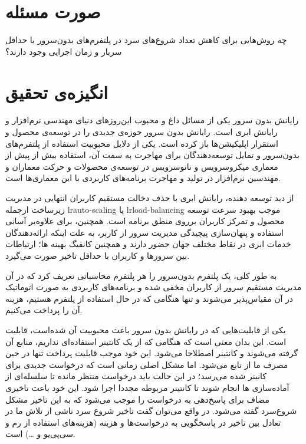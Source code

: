\label{intro}

\section{صورت مسئله}
\par 
چه روش‌هایی برای کاهش تعداد شروع‌های سرد در پلتفرم‌های بدون‌سرور  با حداقل سربار  و زمان اجرایی وجود دارند؟ 

\section{انگیزه‌ی تحقیق}
\par
رایانش بدون سرور یکی از مسائل داغ و محبوب این‌روز‌های دنیای مهندسی نرم‌افزار و رایانش ابری است. رایانش بدون سرور حوزه‌ی جدیدی را در توسعه‌ی محصول و استقرار اپلیکیشن‌ها باز کرده است. یکی از دلایل محبوبیت استفاده از پلتفرم‌های بدون‌سرور و تمایل توسعه‌دهندگان برای مهاجرت به سمت آن، استفاده بیش از پیش از معماری میکروسرویس و نانوسرویس در توسعه‌ی محصولات و حرکت معماران و مهندسین نرم‌افزار در تولید و مهاجرت برنامه‌های کاربردی با این معماری‌ها است.

\par 
از دید توسعه دهنده، رایانش ابری با حذف دخالت مستقیم کاربران انتهایی در مدیریت زیرساخت ازجمله lr{auto-scaling} یا lr{load-balancing} موجب بهبود سرعت توسعه محصول و تمرکز کاربران برروی منطق برنامه است. همچنین، برای علاوه‌بر آسانی استفاده و پنهان‌سازی پیچیدگی مدیریت سرور از کاربر، به علت اینکه ارائه‌دهندگان خدمات ابری در نقاط مختلف جهان حضور دارند و همچنین کانفیگ بهینه ها؛  ارتباطات بین سرورها و کاربران با حداقل تاخیر صورت می‌گیرد. 

\par
به طور کلی، یک‌ پلتفرم بدون‌سرور را هر پلتفرم محاسباتی تعریف کرد که در آن مدیریت مستقیم سرور از کاربران مخفی شده و برنامه‌های کاربردی به صورت اتوماتیک در آن مقیاس‌پذیر می‌شوند و تنها هنگامی که در حال استفاده از پلتفرم هستیم، هزینه آن را پرداخت می‌کنیم. \cite{The_Rise_of_Serverless_Computing}

\par 
یکی از قابلیت‌هایی که در رایانش بدون سرور باعث محبوبیت آن شده‌است، قابلیت  است. این بدان معنی است که هنگامی که از یک کانتینر استفاده‌ای نداریم، منابع آن گرفته‌ می‌شوند و کانتینر اصطلاحا  می‌شود. این خود موجب قابلیت پرداخت تنها در حین مصرف ما از تابع می‌شود. اما مشکل اصلی زمانی است که درخواست جدیدی برای کانینر  شده می‌رسد؛ در این حالت باید درخواست منتظر مانده تا سلسله‌ای از آماده‌سازی ها انجام شوند تا کانتینر مربوطه مجددا اجرا شود. این خود باعث تاخیری مضاف برای پاسخ‌دهی به درخواست را موجب می‌شود که به این تاخیر مشکل شروع‌سرد   گفته می‌شود. در واقع می‌توان گفت تاخیر شروع سرد ناشی از تلاش ما در تعادل بین تاخیر در پاسخگویی به درخواست‌ها و هزینه (هزینه‌های استفاده از رم و سی‌پی‌یو و …) است.

